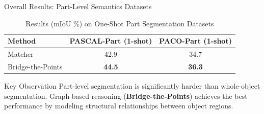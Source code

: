 \documentclass[aspectratio=169, 10pt]{beamer}
\begin{document}
\begin{frame}{Overall Results: Part-Level Semantics Datasets}
\vspace{-0.2cm}
\begin{table}[htbp]
\centering
\caption{Results (mIoU \%) on One-Shot Part Segmentation Datasets}
\renewcommand{\arraystretch}{1.2}
\small
\begin{tabular}{l c c}
\toprule
\textbf{Method} & \textbf{PASCAL-Part (1-shot)} & \textbf{PACO-Part (1-shot)} \\
\midrule
Matcher \cite{liu2023matcher} & 42.9 & 34.7 \\
Bridge-the-Points \cite{zhang2024bridge} & \textbf{44.5} & \textbf{36.3} \\
\bottomrule
\end{tabular}
\end{table}

\vspace{0.3cm}

\begin{alertblock}{Key Observation}
\footnotesize Part-level segmentation is significantly harder than whole-object segmentation.  
Graph-based reasoning (\textbf{Bridge-the-Points}) achieves the best performance by modeling structural relationships between object regions.
\end{alertblock}
\end{frame}
\end{document}
